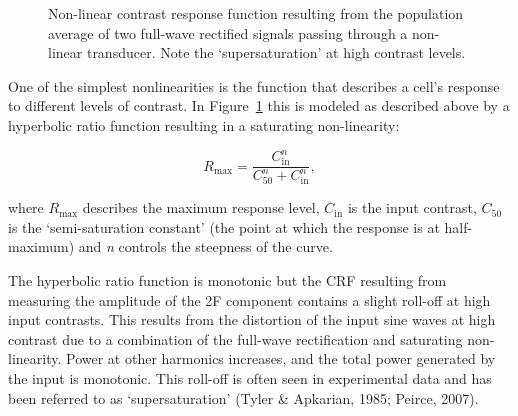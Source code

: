 \documentclass[
  letterpaper,
  DIV=11,
  numbers=noendperiod]{scrartcl}
\begin{document}
\begin{figure}


\caption{\label{fig-contrastresponsefunction}Non-linear contrast
response function resulting from the population average of two full-wave
rectified signals passing through a non-linear transducer. Note the
`supersaturation' at high contrast levels.}

\end{figure}%

One of the simplest nonlinearities is the function that describes a
cell's response to different levels of contrast. In
Figure~\ref{fig-contrastresponsefunction} this is modeled as described
above by a hyperbolic ratio function resulting in a saturating
non-linearity:

\begin{equation}
R_{\mathrm{max}} = \frac{C_{\mathrm{in}}^n}{C_{50}^n + C_{\mathrm{in}}^n},
\end{equation}

where \({R_{\mathrm{max}}}\) describes the maximum response level,
\(C_{\mathrm{in}}\) is the input contrast, \(C_{50}\) is the
`semi-saturation constant' (the point at which the response is at
half-maximum) and \emph{n} controls the steepness of the curve.

The hyperbolic ratio function is monotonic but the CRF resulting from
measuring the amplitude of the 2F component contains a slight roll-off
at high input contrasts. This results from the distortion of the input
sine waves at high contrast due to a combination of the full-wave
rectification and saturating non-linearity. Power at other harmonics
increases, and the total power generated by the input is monotonic. This
roll-off is often seen in experimental data and has been referred to as
`supersaturation' (Tyler \& Apkarian, 1985; Peirce, 2007).
\end{document}
